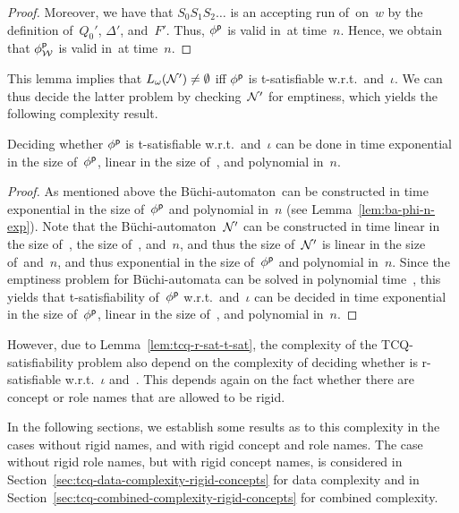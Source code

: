 \begin{proof}
    Moreover, we have that $S_0S_1S_2\dots$ is an accepting run of~\Nmc on~$w$
    by the definition of~$Q_0'$, $\Delta'$, and~$F'$.  Thus, $\phi^\mathsf{p}$ is
    valid in~\Wmf at time~$n$.
    Hence, we obtain that $\phi^\mathsf{p}_\mathcal{W}$ is valid in~\Wmf at time~$n$.
\end{proof}

\noindent
This lemma implies that $L_\omega(\mathcal{N}')\ne\emptyset$ iff $\phi^\mathsf{p}$ is
t-satisfiable w.r.t.~\Wmc and~$\iota$.  We can thus decide the latter problem by
checking~$\mathcal{N}'$ for emptiness, which yields the following complexity result.

\begin{lemma}\label{lem:tcq-t-sat}
    Deciding whether $\phi^\mathsf{p}$ is t-satisfiable w.r.t.~\Wmc and~$\iota$ can be
    done in time exponential in the size of~$\phi^\mathsf{p}$, linear in the size
    of~\Wmc, and polynomial in~$n$.
\end{lemma}

\begin{proof}
    As mentioned above the Büchi-automaton~\Nmc can be constructed in time
    exponential in the size of~$\phi^\mathsf{p}$ and polynomial in~$n$ (see
    Lemma~\ref{lem:ba-phi-n-exp}).
    Note that the Büchi-automaton~$\mathcal{N}'$ can be constructed in time linear
    in the size of~\Nmc, the size of~\Wmc, and~$n$, and thus the
    size of~$\mathcal{N}'$ is linear in the size of~\Nmc and~$n$, and thus
    exponential in the size of~$\phi^\mathsf{p}$ and polynomial in~$n$.
    Since the emptiness problem for Büchi-automata can be solved in polynomial
    time~\cite{VaWo-IC94}, this yields that t-satisfiability of~$\phi^\mathsf{p}$
    w.r.t.~\Wmc and~$\iota$ can be decided in time exponential in the size
    of~$\phi^\mathsf{p}$, linear in the size of~\Wmc, and polynomial in~$n$.
\end{proof}

\noindent
However, due to Lemma~\ref{lem:tcq-r-sat-t-sat}, the complexity of the
TCQ-satisfiability problem also depend on the complexity of deciding whether
\Wmc is r-satisfiable w.r.t.~$\iota$ and~\Kmc.  This depends again on the fact
whether there are concept or role names that are allowed to be rigid.

In the following sections, we establish some results as to this complexity in
the cases without rigid names, and with rigid concept and role names.
%
The case without rigid role names, but with
rigid concept names, is considered in
Section~\ref{sec:tcq-data-complexity-rigid-concepts} for data
complexity and in Section~\ref{sec:tcq-combined-complexity-rigid-concepts} for
combined complexity.


